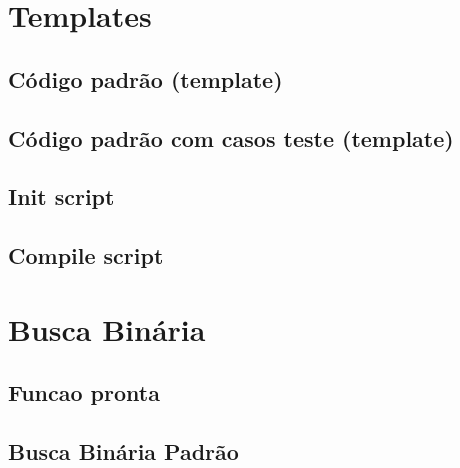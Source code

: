 \setcounter{page}{1}
\section{Templates}

\subsection{Código padrão (template)}


\subsection{Código padrão com casos teste (template)}


\subsection{Init script}


\subsection{Compile script}



\section{Busca Binária}

\subsection{Funcao pronta}


\subsection{Busca Binária Padrão}


